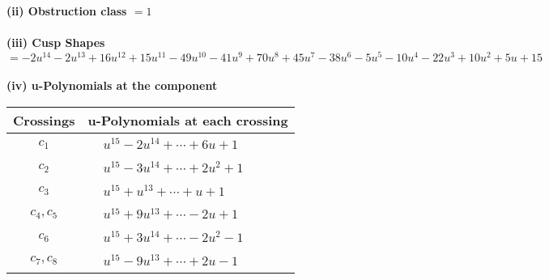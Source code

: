 \documentclass[1p]{elsarticle_modified}
\theoremstyle{definition}
\begin{document}
\flushleft \textbf{(ii) Obstruction class $= 1$}\\~\\
\flushleft \textbf{(iii) Cusp Shapes $= -2 u^{14}-2 u^{13}+16 u^{12}+15 u^{11}-49 u^{10}-41 u^9+70 u^8+45 u^7-38 u^6-5 u^5-10 u^4-22 u^3+10 u^2+5 u+15$}\\~\\
\newpage\renewcommand{\arraystretch}{1}
\flushleft \textbf{(iv) u-Polynomials at the component}\newline \\
\begin{tabular}{m{50pt}|m{274pt}}
Crossings & \hspace{64pt}u-Polynomials at each crossing \\
\hline $$\begin{aligned}c_{1}\end{aligned}$$&$\begin{aligned}
&u^{15}-2 u^{14}+\cdots+6 u+1
\end{aligned}$\\
\hline $$\begin{aligned}c_{2}\end{aligned}$$&$\begin{aligned}
&u^{15}-3 u^{14}+\cdots+2 u^2+1
\end{aligned}$\\
\hline $$\begin{aligned}c_{3}\end{aligned}$$&$\begin{aligned}
&u^{15}+u^{13}+\cdots+u+1
\end{aligned}$\\
\hline $$\begin{aligned}c_{4},c_{5}\end{aligned}$$&$\begin{aligned}
&u^{15}+9 u^{13}+\cdots-2 u+1
\end{aligned}$\\
\hline $$\begin{aligned}c_{6}\end{aligned}$$&$\begin{aligned}
&u^{15}+3 u^{14}+\cdots-2 u^2-1
\end{aligned}$\\
\hline $$\begin{aligned}c_{7},c_{8}\end{aligned}$$&$\begin{aligned}
&u^{15}-9 u^{13}+\cdots+2 u-1
\end{aligned}$\\

\end{tabular}
\end{document}
